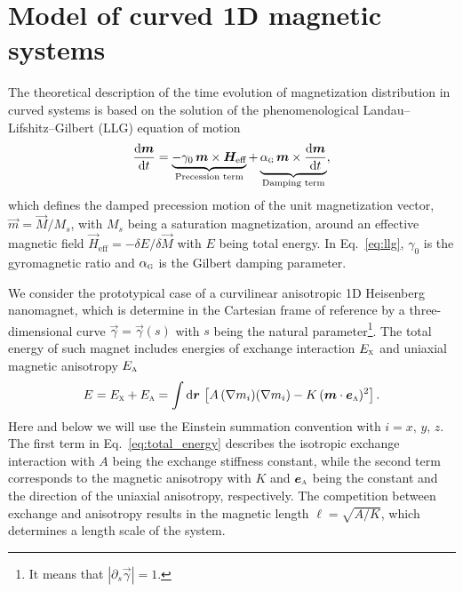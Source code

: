 \section{Model of curved 1D magnetic systems}\label{sec:theory_1D}

The theoretical description of the time evolution of magnetization distribution in curved systems is based on the solution of the phenomenological Landau--Lifshitz--Gilbert (LLG) equation of motion
\begin{equation}\label{eq:llg}
\frac{\mathrm{d}\vec{m}}{\mathrm{d}t}=\underbrace{-\gamma_0\, \vec{m}\times\vec{H}_\textrm{eff}}_{\text{Precession term}} + \underbrace{\alpha_\textsc{g}\, \vec{m}\times\frac{\mathrm{d}\vec{m}}{\mathrm{d}t}}_{\text{Damping term}},
\end{equation}
which defines the damped precession motion of the unit magnetization vector, $\vec{m}=\vec{M}/M_s$, with $M_s$ being a saturation magnetization, around an effective magnetic field $\vec{H}_\textrm{eff}=-\delta E/\delta\vec{M}$ with $E$ being total energy. In Eq.~\eqref{eq:llg}, $\gamma_0$ is the gyromagnetic ratio and $\alpha_\textsc{g}$ is the Gilbert damping parameter.

We consider the prototypical case of a curvilinear anisotropic 1D Heisenberg nanomagnet, which is determine in the Cartesian frame of reference by a three-dimensional curve $\vec{\gamma}=\vec{\gamma}(s)$ with $s$ being the natural parameter\footnote{It means that $|\partial_s\vec{\gamma}|=1$.}. The total energy of such magnet includes energies of exchange interaction $E_\textsc{x}$ and uniaxial magnetic anisotropy $E_\textsc{a}$
\begin{equation}\label{eq:total_energy}
E=E_\textsc{x} + E_\textsc{a} =\int\mathrm{d}\vec{r}\, \left[A \, (\nabla m_i)(\nabla m_i)-K \, (\vec{m}\cdot \vec{e}_\textsc{a})^2 \right].
\end{equation}
Here and below we will use the Einstein summation convention with $i = x,\,y,\,z$. The first term in Eq.~\eqref{eq:total_energy} describes the isotropic exchange interaction with $A$ being the exchange stiffness constant, while the second term corresponds to the magnetic anisotropy with $K$ and $\vec{e}_\textsc{a}$ being the constant and the direction of the uniaxial anisotropy, respectively. The competition between exchange and anisotropy results in the magnetic length $\ell=\sqrt{A/K}$, which determines a length scale of the system.

